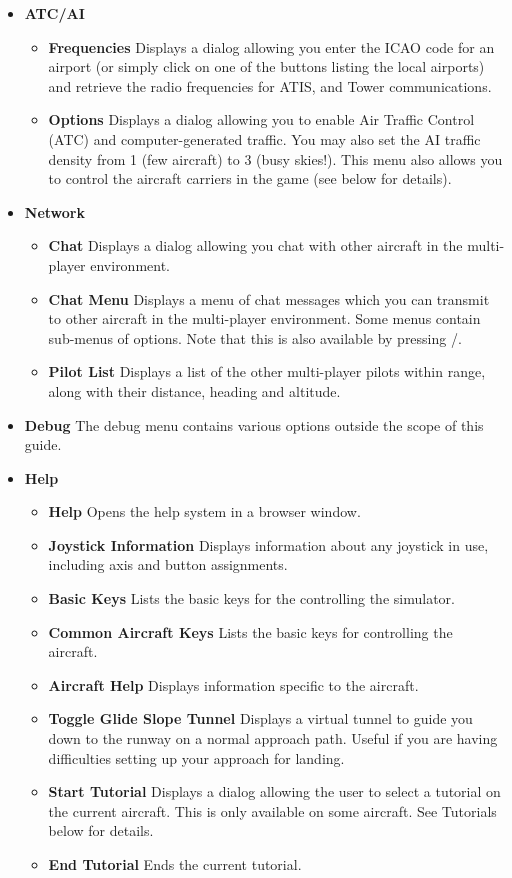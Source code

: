 \begin{itemize}
\item \textbf{ATC/AI}
 \begin{itemize}
  \item \textbf{Frequencies}  Displays a dialog allowing you enter the ICAO code
for an airport
  (or simply click on one of the buttons listing the local airports) and
retrieve the radio
  frequencies for ATIS, and Tower communications.
  \item \textbf{Options}  Displays a dialog allowing you to enable Air Traffic
Control (ATC) and
  computer-generated traffic. You may also set the AI traffic density from 1
(few aircraft) to 3 (busy skies!).
  This menu also allows you to control the aircraft carriers in the game (see
below for details).
 \end{itemize}

\item \textbf{Network}
 \begin{itemize}
  \item \textbf{Chat} Displays a dialog allowing you chat with other aircraft in
the multi-player environment. 
  \item \textbf{Chat Menu} Displays a menu of chat messages which you can
  transmit to other aircraft in the multi-player environment. Some menus
  contain sub-menus of options. Note that this is also available by pressing /.
  \item \textbf{Pilot List} Displays a list of the other multi-player pilots 
  within range, along with their distance, heading and altitude.
\end{itemize}

\item \textbf{Debug} The debug menu contains various options
outside the scope of this guide.

 \item \textbf{Help}
 \begin{itemize}
 \item \textbf{Help} Opens the help system in a browser window.
 \item \textbf{Joystick Information} Displays information about any joystick
 in use, including axis and button assignments.
 \item \textbf{Basic Keys} Lists the basic keys for the controlling the
simulator.
 \item \textbf{Common Aircraft Keys} Lists the basic keys for controlling the
aircraft.
 \item \textbf{Aircraft Help} Displays information specific to the aircraft.
 \item \textbf{Toggle Glide Slope Tunnel} Displays a virtual tunnel to guide
 you down to the runway on a normal approach path. Useful if you are having
 difficulties setting up your approach for landing.
 \item \textbf{Start Tutorial} Displays a dialog allowing the user to select a
tutorial on the current aircraft.
 This is only available on some aircraft. See Tutorials below for details.
 \item \textbf{End Tutorial}  Ends the current tutorial.
 \end{itemize}
\end{itemize}


